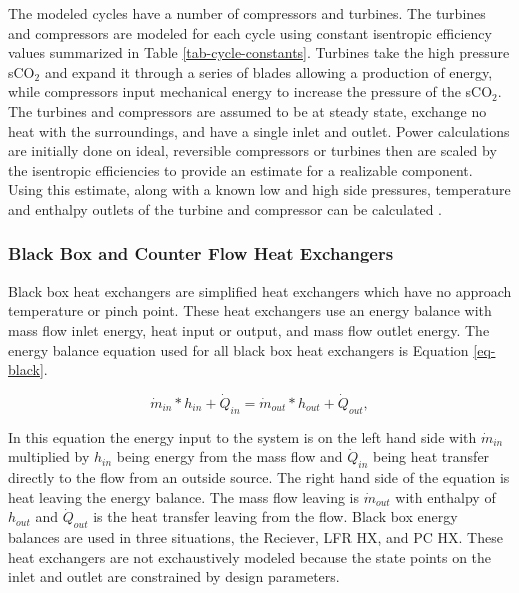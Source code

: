 The modeled cycles have a number of compressors and turbines. The turbines and compressors are modeled for each cycle using constant isentropic efficiency values summarized in Table \ref{tab-cycle-constants}. Turbines take the high pressure sCO$_2$ and expand it through a series of blades allowing a production of energy, while compressors input mechanical energy to increase the pressure of the sCO$_2$. The turbines and compressors are assumed to be at steady state, exchange no heat with the surroundings, and have a single inlet and outlet. Power calculations are initially done on ideal, reversible compressors or turbines then are scaled by the isentropic efficiencies to provide an estimate for a realizable component. Using this estimate, along with a known low and high side pressures, temperature and enthalpy outlets of the turbine and compressor can be calculated \cite{klein_nellis_2011}. 

\subsubsection{Black Box and Counter Flow Heat Exchangers}

Black box heat exchangers are simplified heat exchangers which have no approach temperature or pinch point. These heat exchangers use an energy balance with mass flow inlet energy, heat input or output, and mass flow outlet energy. The energy balance equation used for all black box heat exchangers is Equation \ref{eq-black}.

\begin{equation}
    \label{eq-black}
    \dot{m}_{in}*h_{in} + \dot{Q}_{in} = \dot{m}_{out}*h_{out} + \dot{Q}_{out},
\end{equation}

In this equation the energy input to the system is on the left hand side with $\dot{m}_{in}$ multiplied by $h_{in}$ being energy from the mass flow and $\dot{Q}_{in}$ being heat transfer directly to the flow from an outside source. The right hand side of the equation is heat leaving the energy balance. The mass flow leaving is $\dot{m}_{out}$ with enthalpy of $h_{out}$ and $\dot{Q}_{out}$ is the heat transfer leaving from the flow. Black box energy balances are used in three situations, the Reciever, LFR HX, and PC HX. These heat exchangers are not exchaustively modeled because the state points on the inlet and outlet are constrained by design parameters.

